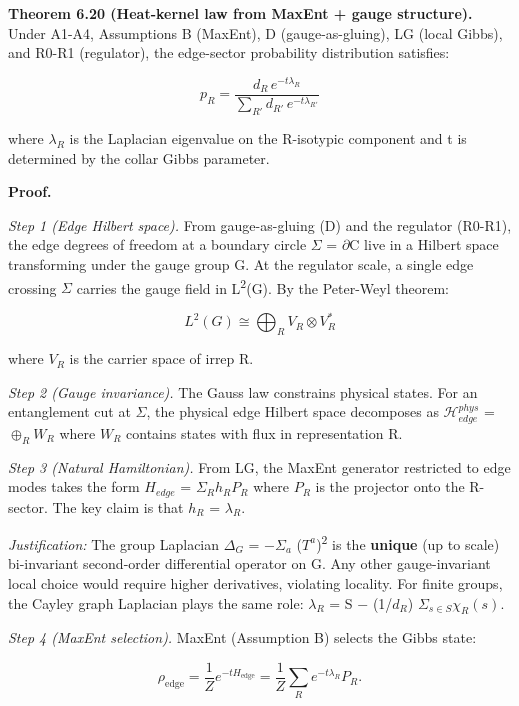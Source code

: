 \documentclass[11pt,a4paper]{article}
\theoremstyle{remark}
\begin{document}
\textbf{Theorem 6.20 (Heat-kernel law from MaxEnt + gauge structure).} Under A1-A4,
Assumptions B (MaxEnt), D (gauge-as-gluing), LG (local Gibbs), and R0-R1
(regulator), the edge-sector probability distribution satisfies:

\[
p_R = \frac{d_R \, e^{-t \lambda_R}}{\sum_{R'} d_{R'} \, e^{-t \lambda_{R'}}}
\]

where \(\ensuremath{\lambda}_R\) is the Laplacian eigenvalue on the R-isotypic component
and t is determined by the collar Gibbs parameter.

\textbf{Proof.}

\emph{Step 1 (Edge Hilbert space).} From gauge-as-gluing (D) and the regulator
(R0-R1), the edge degrees of freedom at a boundary circle \ensuremath{\Sigma} = \ensuremath{\partial}C
live in a Hilbert space transforming under the gauge group G. At the
regulator scale, a single edge crossing \ensuremath{\Sigma} carries the gauge field in
L\textsuperscript{2}(G). By the Peter-Weyl theorem:

\[
L^2(G) \cong \bigoplus_R V_R \otimes V_R^*
\]

where \(V_R\) is the carrier space of irrep R.

\emph{Step 2 (Gauge invariance).} The Gauss law constrains physical states. For an
entanglement cut at \ensuremath{\Sigma}, the physical edge Hilbert space decomposes as
\(\ensuremath{\mathcal{H}}_{edge}^{phys}\) = \(\ensuremath{\oplus}_R W_R\) where \(W_R\)
contains states with flux in representation R.

\emph{Step 3 (Natural Hamiltonian).} From LG, the MaxEnt generator restricted to
edge modes takes the form \(H_{edge}\) = \(\ensuremath{\Sigma}_R h_R P_R\) where \(P_R\) is
the projector onto the R-sector. The key claim is that \(h_R\) = \(\ensuremath{\lambda}_R\).

\emph{Justification:} The group Laplacian \(\ensuremath{\Delta}_G\) = \ensuremath{-}\(\ensuremath{\Sigma}_a\) (\(T^a\))\textsuperscript{2} is the
\textbf{unique} (up to scale) bi-invariant second-order differential operator on
G. Any other gauge-invariant local choice would require higher derivatives,
violating locality. For finite groups, the Cayley graph Laplacian plays the
same role: \(\ensuremath{\lambda}_R\) = \textbar S\textbar{} \ensuremath{-} (1/\(d_R\)) \(\ensuremath{\Sigma}_{s\ensuremath{\in}S} \ensuremath{\chi}_R(s)\).

\emph{Step 4 (MaxEnt selection).} MaxEnt (Assumption B) selects the Gibbs state:

\[
\rho_{\mathrm{edge}} = \frac{1}{Z} e^{-t H_{\mathrm{edge}}} = \frac{1}{Z}
\sum_R e^{-t \lambda_R} P_R.
\]
\end{document}
